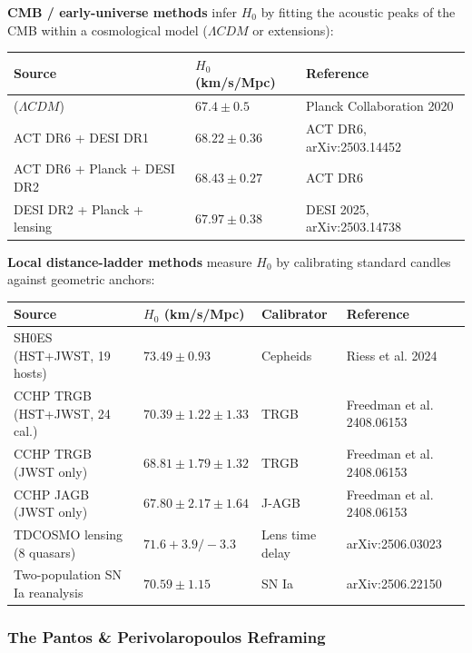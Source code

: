 \documentclass[aps,prd,preprint,superscriptaddress,longbibliography,floatfix]{revtex4-2}
\theoremstyle{remark}
\begin{document}
\textbf{CMB / early-universe methods} infer $H_{0}$ by fitting the acoustic peaks of the CMB within a cosmological model ($\Lambda CDM$ or extensions):


\begin{table}[H]
\begin{ruledtabular}
\begin{tabular}{p{5.0cm}p{5.0cm}p{5.0cm}}
Source & $H_{0}$ (km/s/Mpc) & Reference \\
\hline
\cite{Planck2018_VI} ($\Lambda CDM$) & $67.4 \pm 0.5$ & Planck Collaboration 2020 \\
ACT DR6 + DESI DR1 & $68.22 \pm 0.36$ & ACT DR6, arXiv:2503.14452 \\
ACT DR6 + Planck + DESI DR2 & $68.43 \pm 0.27$ & ACT DR6 \\
DESI DR2 + Planck + lensing & $67.97 \pm 0.38$ & DESI 2025, arXiv:2503.14738 \\
\end{tabular}
\end{ruledtabular}
\end{table}

\textbf{Local distance-ladder methods} measure $H_{0}$ by calibrating standard candles against geometric anchors:


\begin{table}[H]
\begin{ruledtabular}
\begin{tabular}{p{3.8cm}p{3.8cm}p{3.8cm}p{3.8cm}}
Source & $H_{0}$ (km/s/Mpc) & Calibrator & Reference \\
\hline
SH0ES (HST+JWST, 19 hosts) & $73.49 \pm 0.93$ & Cepheids & Riess et al. 2024 \\
CCHP TRGB (HST+JWST, 24 cal.) & $70.39 \pm 1.22 \pm 1.33$ & TRGB & Freedman et al. 2408.06153 \\
CCHP TRGB (JWST only) & $68.81 \pm 1.79 \pm 1.32$ & TRGB & Freedman et al. 2408.06153 \\
CCHP JAGB (JWST only) & $67.80 \pm 2.17 \pm 1.64$ & J-AGB & Freedman et al. 2408.06153 \\
TDCOSMO lensing (8 quasars) & $71.6 +3.9/-3.3$ & Lens time delay & arXiv:2506.03023 \\
Two-population SN Ia reanalysis & $70.59 \pm 1.15$ & SN Ia & arXiv:2506.22150 \\
\end{tabular}
\end{ruledtabular}
\end{table}


\subsubsection{The Pantos \& Perivolaropoulos Reframing}
\end{document}
